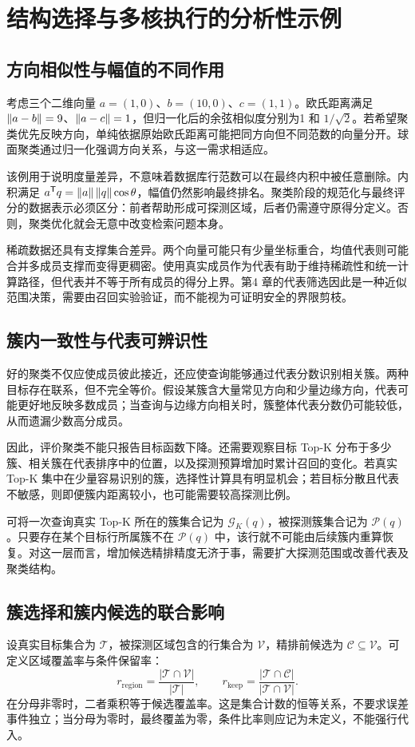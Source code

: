 \section{结构选择与多核执行的分析性示例}
\subsection{方向相似性与幅值的不同作用}
考虑三个二维向量 $a=(1,0)$、$b=(10,0)$、$c=(1,1)$。欧氏距离满足 $\left\lVert a-b\right\rVert=9$、$\left\lVert a-c\right\rVert=1$，但归一化后的余弦相似度分别为1 和 $1/\sqrt2$。若希望聚类优先反映方向，单纯依据原始欧氏距离可能把同方向但不同范数的向量分开。球面聚类通过归一化强调方向关系，与这一需求相适应。

该例用于说明度量差异，不意味着数据库行范数可以在最终内积中被任意删除。内积满足 $a^{\mathsf T}q=\left\lVert a\right\rVert\left\lVert q\right\rVert\cos\theta$，幅值仍然影响最终排名。聚类阶段的规范化与最终评分的数据表示必须区分：前者帮助形成可探测区域，后者仍需遵守原得分定义。否则，聚类优化就会无意中改变检索问题本身。

稀疏数据还具有支撑集合差异。两个向量可能只有少量坐标重合，均值代表则可能合并多成员支撑而变得更稠密。使用真实成员作为代表有助于维持稀疏性和统一计算路径，但代表并不等于所有成员的得分上界。第4 章的代表筛选因此是一种近似范围决策，需要由召回实验验证，而不能视为可证明安全的界限剪枝。

\subsection{簇内一致性与代表可辨识性}
好的聚类不仅应使成员彼此接近，还应使查询能够通过代表分数识别相关簇。两种目标存在联系，但不完全等价。假设某簇含大量常见方向和少量边缘方向，代表可能更好地反映多数成员；当查询与边缘方向相关时，簇整体代表分数仍可能较低，从而遗漏少数高分成员。

因此，评价聚类不能只报告目标函数下降。还需要观察目标 Top-K 分布于多少簇、相关簇在代表排序中的位置，以及探测预算增加时累计召回的变化。若真实 Top-K 集中在少量容易识别的簇，选择性计算具有明显机会；若目标分散且代表不敏感，则即便簇内距离较小，也可能需要较高探测比例。

可将一次查询真实 Top-K 所在的簇集合记为 $\mathcal G_K(q)$，被探测簇集合记为 $\mathcal P(q)$。只要存在某个目标行所属簇不在 $\mathcal P(q)$ 中，该行就不可能由后续簇内重算恢复。对这一层而言，增加候选精排精度无济于事，需要扩大探测范围或改善代表及聚类结构。

\subsection{簇选择和簇内候选的联合影响}
设真实目标集合为 $\mathcal T$，被探测区域包含的行集合为 $\mathcal V$，精排前候选为 $\mathcal C\subseteq\mathcal V$。可定义区域覆盖率与条件保留率：
\begin{equation}
 r_{\mathrm{region}}=\frac{|\mathcal T\cap\mathcal V|}{|\mathcal T|},\qquad
 r_{\mathrm{keep}}=\frac{|\mathcal T\cap\mathcal C|}{|\mathcal T\cap\mathcal V|}.
\end{equation}
在分母非零时，二者乘积等于候选覆盖率。这是集合计数的恒等关系，不要求误差事件独立；当分母为零时，最终覆盖为零，条件比率则应记为未定义，不能强行代入。

